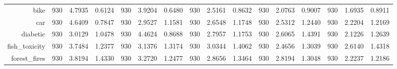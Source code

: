 \begin{table}[htbp]
{\begin{tabular}{rccccccccccccccc}
			bike                                & 930                                      & 4.7935                                                                    & 0.6124          & 930                            & 3.9204          & 0.6480          & 930                             & 2.5161          & 0.8632          & 930                             & 2.0763                                                                    & 0.9007          & 930                             & \cellcolor[rgb]{ .776,  .937,  .808}\textcolor[rgb]{ 0,  .38,  0}{1.6935}          & 0.8911          \\
			car                                 & 930                                      & 4.6409                                                                    & 0.7847          & 930                            & 2.9527          & 1.1581          & 930                             & 2.6548          & 1.1748          & 930                             & 2.5312                                                                    & 1.2440          & 930                             & \cellcolor[rgb]{ .776,  .937,  .808}\textcolor[rgb]{ 0,  .38,  0}{2.2204}          & 1.2169          \\
			diabetic                            & 930                                      & 3.0129                                                                    & 1.0478          & 930                            & 4.4624          & 0.8688          & 930                             & 2.7957          & 1.1753          & 930                             & 2.6065                                                                    & 1.4391          & 930                             & \cellcolor[rgb]{ .776,  .937,  .808}\textcolor[rgb]{ 0,  .38,  0}{2.1226}          & 1.2639          \\
			fish\_toxicity                      & 930                                      & 3.7484                                                                    & 1.2377          & 930                            & 3.1376          & 1.3174          & 930                             & 3.0344          & 1.4062          & 930                             & \cellcolor[rgb]{ .776,  .937,  .808}\textcolor[rgb]{ 0,  .38,  0}{2.4656} & 1.3039          & 930                             & 2.6140                                                                             & 1.4318          \\
			forest\_fires                       & 930                                      & 3.8194                                                                    & 1.4330          & 930                            & 3.2720          & 1.2477          & 930                             & 2.8656          & 1.3464          & 930                             & 2.8194                                                                    & 1.3048          & 930                             & \cellcolor[rgb]{ .776,  .937,  .808}\textcolor[rgb]{ 0,  .38,  0}{2.2237}          & 1.2186          \\

\end{tabular}}
\end{table}
